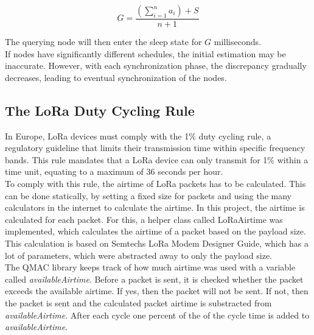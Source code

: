 \[G = \frac{(\sum_{i=1}^{n}a_i) + S}{n + 1}\]

The querying node will then enter the sleep state for \( G \) milliseconds. \\

If nodes have significantly different schedules, the initial estimation may be inaccurate. However, with each synchronization phase, the discrepancy gradually decreases, leading to eventual synchronization of the nodes.

\subsection*{The LoRa Duty Cycling Rule}

In Europe, LoRa devices must comply with the 1\% duty cycling rule, a regulatory guideline that limits their transmission time within specific frequency bands. This rule mandates that a LoRa device can only transmit for 1\% within a time unit, equating to a maximum of 36 seconds per hour.\\

To comply with this rule, the airtime of LoRa packets has to be calculated. This can be done statically, by setting a fixed size for packets and using the many calculators in the internet to calculate the airtime. In this project, the airtime is calculated for each packet. For this, a helper class called LoRaAirtime was implemented, which calculates the airtime of a packet based on the payload size. This calculation is based on Semtechs LoRa Modem Designer Guide, which has a lot of parameters, which were abstracted away to only the payload size.\\

The QMAC library keeps track of how much airtime was used with a variable called \textit{availableAirtime}. Before a packet is sent, it is checked whether the packet exceeds the available airtime. If yes, then the packet will not be sent. If not, then the packet is sent and the calculated packet airtime is substracted from \textit{availableAirtime}. After each cycle one percent of the of the cycle time is added to \textit{availableAirtime}.
